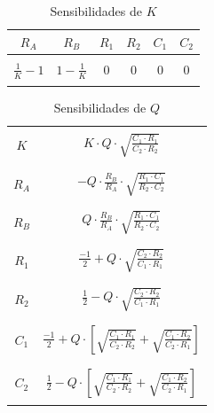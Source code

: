 \begin{table}[H]
    \centering
    \begin{tabular}{c c c c c c}
        $R_A$ & $R_B$ & $R_1$ & $R_2$ & $C_1$ & $C_2$ \\
        \hline \\
        $\frac{1}{K} - 1$ & $1 - \frac{1}{K}$ & $0$ & $0$ & $0$ & $0$ \\
        \\
        \hline
    \end{tabular}
    \caption{Sensibilidades de $K$}
\end{table}

\begin{table}[H]
    \centering
    \begin{tabular}{c | c}
        \hline \\
        $K$ & $K \cdot Q \cdot \sqrt{\frac{C_1 \cdot R_1}{C_2 \cdot R_2}}$ \\
        \\ \hline \\
        $R_A$ & $-Q \cdot \frac{R_B}{R_A} \cdot \sqrt{\frac{R_1 \cdot C_1}{R_2 \cdot C_2}}$ \\
        \\ \hline \\
        $R_B$ & $Q \cdot \frac{R_B}{R_A} \cdot \sqrt{\frac{R_1 \cdot C_1}{R_2 \cdot C_2}}$ \\
        \\ \hline \\
        $R_1$ & $\frac{-1}{2} + Q \cdot \sqrt{\frac{C_2 \cdot R_2}{C_1 \cdot R_1}}$ \\
        \\ \hline \\
        $R_2$ & $\frac{1}{2} - Q \cdot \sqrt{\frac{C_2 \cdot R_2}{C_1 \cdot R_1}}$ \\
        \\ \hline \\
        $C_1$ & $\frac{-1}{2} + Q \cdot \left[ \sqrt{\frac{C_1 \cdot R_1}{C_2 \cdot R_2}} + \sqrt{\frac{C_1 \cdot R_2}{C_2 \cdot R_1}} \right]$ \\
        \\ \hline \\
        $C_2$ & $\frac{1}{2} - Q \cdot \left[ \sqrt{\frac{C_1 \cdot R_1}{C_2 \cdot R_2}} + \sqrt{\frac{C_1 \cdot R_2}{C_2 \cdot R_1}} \right]$ \\
        \\ \hline
    \end{tabular}
    \caption{Sensibilidades de $Q$}
\end{table}

